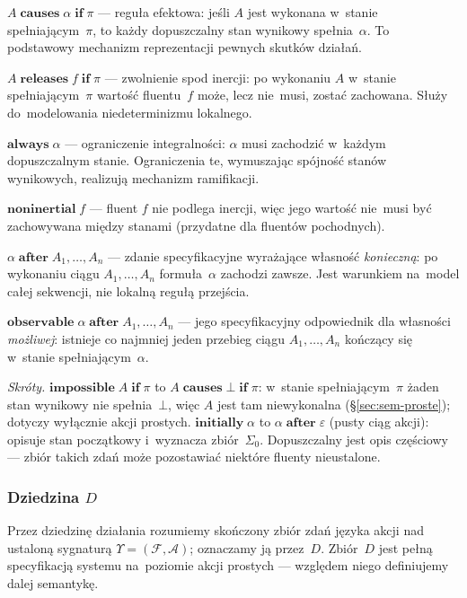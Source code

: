 \documentclass[11pt,a4paper]{article}
\newcommand{\causes}{\textbf{causes}}
\newcommand{\aft}{\textbf{after}}
\renewcommand{\iff}{\textbf{if}}
\newcommand{\initially}{\textbf{initially}}
\newcommand{\always}{\textbf{always}}
\newcommand{\impossible}{\textbf{impossible}}
\newcommand{\releases}{\textbf{releases}}
\newcommand{\noninertial}{\textbf{noninertial}}
\newcommand{\observable}{\textbf{observable}}
\theoremstyle{definition}
\begin{document}
\smallskip\noindent
$A \;\causes\; \alpha \;\iff\; \pi$ --- reguła efektowa: jeśli $A$ jest wykonana w~stanie spełniającym~$\pi$, to każdy dopuszczalny stan wynikowy spełnia~$\alpha$. To podstawowy mechanizm reprezentacji pewnych skutków działań.

\smallskip\noindent
$A \;\releases\; f \;\iff\; \pi$ --- zwolnienie spod inercji: po wykonaniu $A$ w~stanie spełniającym~$\pi$ wartość fluentu~$f$ może, lecz nie~musi, zostać zachowana. Służy do~modelowania niedeterminizmu lokalnego.

\smallskip\noindent
$\always\; \alpha$ --- ograniczenie integralności: $\alpha$ musi zachodzić w~każdym dopuszczalnym stanie. Ograniczenia te, wymuszając spójność stanów wynikowych, realizują mechanizm ramifikacji.

\smallskip\noindent
$\noninertial\; f$ --- fluent $f$ nie podlega inercji, więc jego wartość nie~musi być zachowywana między stanami (przydatne dla fluentów pochodnych).

\smallskip\noindent
$\alpha \;\aft\; A_1,\dots,A_n$ --- zdanie specyfikacyjne wyrażające własność \emph{konieczną}: po wykonaniu ciągu $A_1,\dots,A_n$ formuła~$\alpha$ zachodzi zawsze. Jest warunkiem na~model całej sekwencji, nie lokalną regułą przejścia.

\smallskip\noindent
$\observable\; \alpha \;\aft\; A_1,\dots,A_n$ --- jego specyfikacyjny odpowiednik dla własności \emph{możliwej}: istnieje co najmniej jeden przebieg ciągu $A_1,\dots,A_n$ kończący się w~stanie spełniającym~$\alpha$.

\smallskip\noindent
\emph{Skróty.}
$\impossible\; A \;\iff\; \pi$ to $A \;\causes\; \bot \;\iff\; \pi$: w~stanie spełniającym~$\pi$ żaden stan wynikowy nie spełnia~$\bot$, więc $A$ jest tam niewykonalna (\S\ref{sec:sem-proste}); dotyczy wyłącznie akcji prostych.
$\initially\; \alpha$ to $\alpha \;\aft\; \varepsilon$ (pusty ciąg akcji): opisuje stan początkowy i~wyznacza zbiór~$\Sigma_0$. Dopuszczalny jest opis częściowy --- zbiór takich zdań może pozostawiać niektóre fluenty nieustalone.

\subsubsection{Dziedzina \texorpdfstring{$D$}{D}}

Przez dziedzinę działania rozumiemy skończony zbiór zdań języka akcji nad ustaloną sygnaturą $\Upsilon=(\mathcal{F},\mathcal{A})$; oznaczamy ją przez~$D$. Zbiór~$D$ jest pełną specyfikacją systemu na~poziomie akcji prostych --- względem niego definiujemy dalej semantykę.
\end{document}
